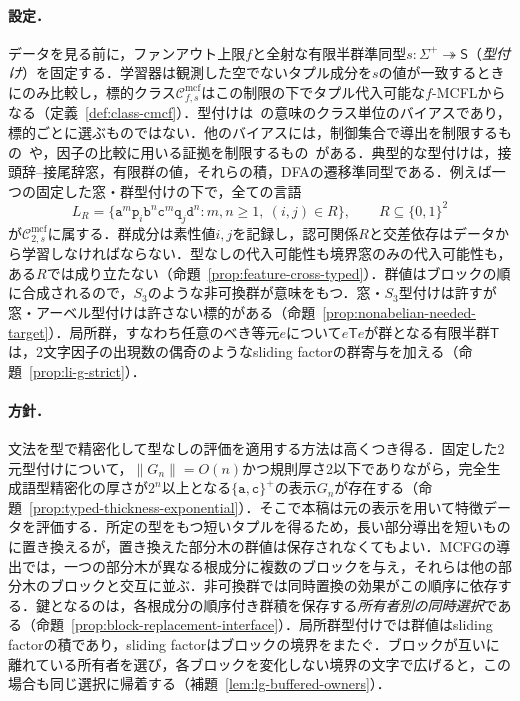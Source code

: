 \documentclass[11pt,a4paper]{ltjsarticle}
\numberwithin{equation}{section}
\theoremstyle{plain}
\theoremstyle{definition}
\theoremstyle{remark}
\newcommand{\Cmcf}[2]{\mathcal{C}^{\mathrm{mcf}}_{#1,#2}}
\begin{document}
\paragraph{設定．}
データを見る前に，ファンアウト上限$f$と全射な有限半群準同型$s:\Sigma^+\twoheadrightarrow\mathsf S$（\emph{型付け}）を固定する．学習器は観測した空でないタプル成分を$s$の値が一致するときにのみ比較し，標的クラス$\Cmcf{f}{s}$はこの制限の下でタプル代入可能な$f$-MCFLからなる（定義~\ref{def:class-cmcf}）．型付けは~\cite{CosteTyping2004}の意味のクラス単位のバイアスであり，標的ごとに選ぶものではない．他のバイアスには，制御集合で導出を制限するもの~\cite{Takada1988,Takada1995}や，因子の比較に用いる証拠を制限するもの~\cite{CosteGaretNicolas2012,CosteNicolas2019}がある．典型的な型付けは，接頭辞--接尾辞窓，有限群の値，それらの積，DFAの遷移準同型である．例えば一つの固定した窓・群型付けの下で，全ての言語
\[
 L_R=\{\mathtt a^m\mathtt p_i\mathtt b^n
       \mathtt c^m\mathtt q_j\mathtt d^n:
       m,n\ge1,\ (i,j)\in R\},\qquad R\subseteq\{0,1\}^2
\]
が$\Cmcf{2}{s}$に属する．群成分は素性値$i,j$を記録し，認可関係$R$と交差依存はデータから学習しなければならない．型なしの代入可能性も境界窓のみの代入可能性も，ある$R$では成り立たない（命題~\ref{prop:feature-cross-typed}）．群値はブロックの順に合成されるので，$S_3$のような非可換群が意味をもつ．窓・$S_3$型付けは許すが窓・アーベル型付けは許さない標的がある（命題~\ref{prop:nonabelian-needed-target}）．局所群，すなわち任意のべき等元$e$について$e\mathsf Te$が群となる有限半群$\mathsf T$は，2文字因子の出現数の偶奇のようなsliding factorの群寄与を加える（命題~\ref{prop:li-g-strict}）．

\paragraph{方針．}
文法を型で精密化して型なしの評価を適用する方法は高くつき得る．固定した2元型付けについて，$\|G_n\|=O(n)$かつ規則厚さ2以下でありながら，完全生成語型精密化の厚さが$2^n$以上となる$\{\mathtt a,\mathtt c\}^+$の表示$G_n$が存在する（命題~\ref{prop:typed-thickness-exponential}）．そこで本稿は元の表示を用いて特徴データを評価する．所定の型をもつ短いタプルを得るため，長い部分導出を短いものに置き換えるが，置き換えた部分木の群値は保存されなくてもよい．MCFGの導出では，一つの部分木が異なる根成分に複数のブロックを与え，それらは他の部分木のブロックと交互に並ぶ．非可換群では同時置換の効果がこの順序に依存する．鍵となるのは，各根成分の順序付き群積を保存する\emph{所有者別の同時選択}である（命題~\ref{prop:block-replacement-interface}）．局所群型付けでは群値はsliding factorの積であり，sliding factorはブロックの境界をまたぐ．ブロックが互いに離れている所有者を選び，各ブロックを変化しない境界の文字で広げると，この場合も同じ選択に帰着する（補題~\ref{lem:lg-buffered-owners}）．
\end{document}
